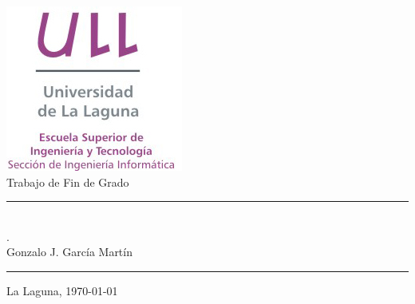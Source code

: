 %
%
%
%

\pagestyle{empty}
\thispagestyle{empty}


\newcommand{\HRule}{\rule{\linewidth}{1mm}}
\setlength{\parindent}{0mm}
\setlength{\parskip}{0mm}


\begin{center}
\includegraphics[scale=0.8]{Imagenes/logo_vertical}\\[10mm]
{\Huge Trabajo de Fin de Grado}
\end{center}

\HRule
\begin{flushright}
        {\Huge \workTitle} \\[2.5mm]
        {\Large \textit{\englishWorkTitle} .} \\[5mm]
        {\Large Gonzalo J. García Martín} \\[5mm]


\end{flushright}
\HRule
{}
\begin{center}
  \Large La Laguna, \today
\end{center}

\setlength{\parindent}{5mm}